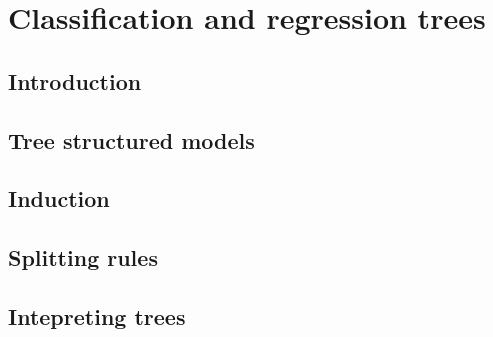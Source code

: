 \chapter{Classification and regression trees}\label{ch:cart}

\section{Introduction}


\section{Tree structured models}


\section{Induction}


\section{Splitting rules}


\section{Intepreting trees}

